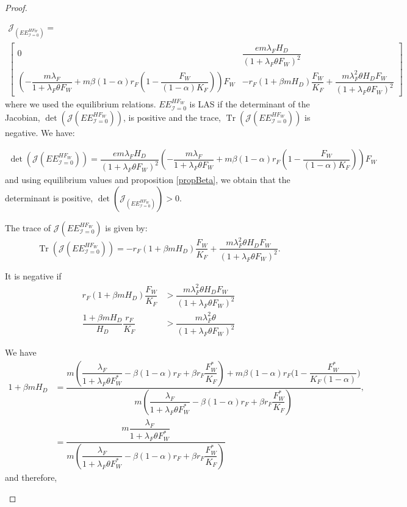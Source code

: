 \documentclass{article}
\newcommand{\lfw}{\lambda_{F}}
\newcommand{\lfw}{\lambda_{F}}
\newcommand{\cI}{\mathcal{I}}
\DeclareMathOperator{\Tr}{Tr}
\begin{document}
\begin{proof}
\begin{itemize}
\begin{multline*}
\mathcal{J}_(EE^{HF_W}_{\cI = 0}) = \\ \begin{bmatrix}
0 & \dfrac{e m \lfw H_D}{(1 + \lfw \theta F_W)^2}  \\
\left(- \dfrac{m \lfw}{1 + \lfw \theta F_W} + m\beta (1-\alpha) r_F \left(1 -\dfrac{F_W}{(1-\alpha) K_F} \right) \right) F_W &
- r_F(1+\beta m H_D) \dfrac{F_W}{K_F} +  \dfrac{ m \lfw^2 \theta H_D F_W}{(1 + \lfw \theta F_W)^2}
\end{bmatrix}
\end{multline*}
where we used the equilibrium relations. $EE^{HF_W}_{\cI = 0}$ is LAS if the determinant of the Jacobian, $ \det(\mathcal{J}(EE^{HF_W}_{\cI = 0}))$, is positive and the trace, $\Tr(\mathcal{J}(EE^{HF_W}_{\cI = 0}))$ is negative. We have:

\begin{multline*}
\det(\mathcal{J}(EE^{HF_W}_{\cI = 0})) = \dfrac{e m \lfw H_D}{(1 + \lfw \theta F_W)^2}\left(- \dfrac{m \lfw}{1 + \lfw \theta F_W} + m\beta (1-\alpha) r_F \left(1 -\dfrac{F_W}{(1-\alpha) K_F} \right) \right) F_W
\end{multline*}
and using equilibrium values and proposition \ref{propBeta}, we obtain that the determinant is positive, $\det(\mathcal{J}_(EE^{HF_W}_{\cI = 0})) > 0$.

The trace of $\mathcal{J}(EE^{HF_W}_{\cI = 0})$ is given by:
\begin{equation*}
\Tr(\mathcal{J}(EE^{HF_W}_{\cI = 0})) = - r_F(1+\beta m H_D) \dfrac{F_W}{K_F} +  \dfrac{ m \lfw^2 \theta H_D F_W}{(1 + \lfw \theta F_W)^2}.
\end{equation*}

It is negative if
\begin{subequations}
\begin{align}
r_F(1+\beta m H_D) \dfrac{F_W}{K_F} &>  \dfrac{ m \lfw^2 \theta H_D F_W}{(1 + \lfw \theta F_W)^2} \\
\dfrac{1+\beta m H_D}{H_D} \dfrac{r_F}{K_F} &>  \dfrac{ m \lfw^2 \theta }{(1 + \lfw \theta F_W)^2} \label{traceCoexistence1}
\end{align}
\end{subequations}

We have 
\begin{align*}
1+ \beta m H_D & = \dfrac{m\left(\dfrac{\lfw}{1 + \lfw \theta F_W^*} - \beta (1-\alpha) r_F + \beta r_F  \dfrac{F^*_{W}}{K_F}\right) + m \beta(1-\alpha)r_F\Big(1 - \dfrac{F^*_{W}}{K_F(1-\alpha)} \Big)}{m\left(\dfrac{\lfw}{1 + \lfw \theta F_W^*} - \beta (1-\alpha) r_F + \beta r_F  \dfrac{F^*_{W}}{K_F}\right)},  \\
&= \dfrac{m\dfrac{\lfw}{1 + \lfw \theta F_W^*}}{m\left(\dfrac{\lfw}{1 + \lfw \theta F_W^*} - \beta (1-\alpha) r_F + \beta r_F  \dfrac{F^*_{W}}{K_F}\right)}
\end{align*} 
and therefore, 


\end{itemize}
\end{proof}
\end{document}

